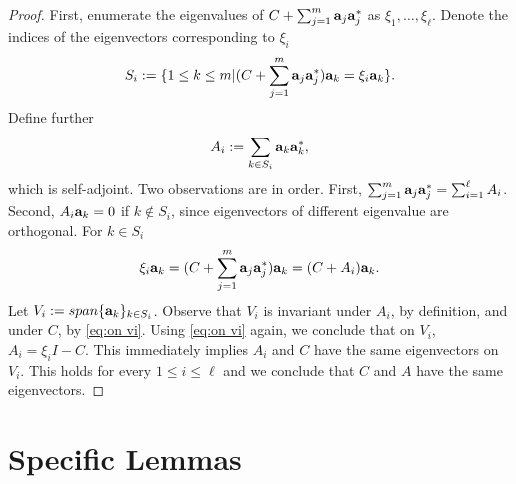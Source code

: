 \documentclass{amsart}
\numberwithin{equation}{section}
\begin{document}
\simdiag
\begin{proof}
  First, enumerate the eigenvalues of $C + \sum_{j=1}^m
  \mathbf{a}_j\mathbf{a}_j^*$ as $\xi_1,\dots,\xi_\ell$. Denote the
  indices of the eigenvectors corresponding to $\xi_i$
  \begin{equation*}
    S_i := \{ 1 \leq k \leq m | (C + \sum_{j=1}^m \mathbf{a}_j\mathbf{a}_j^* )\mathbf{a}_k = \xi_i \mathbf{a}_k \}.
  \end{equation*}
  Define further
  \begin{equation*}
    A_i := \sum_{k \in S_i} \mathbf{a}_k \mathbf{a}_k^*,
  \end{equation*}
  which is self-adjoint. Two observations are in order. First,
  $\sum_{j=1}^m \mathbf{a}_j\mathbf{a}_j^* = \sum_{i=1}^\ell A_i$. Second, $A_i
  \mathbf{a}_k = 0$ if $k\not \in S_i$, since eigenvectors of different
  eigenvalue are orthogonal. For $k \in S_i$
  \begin{equation}\label{eq:on vi}
    \xi_i \mathbf{a}_k = (C + \sum_{j=1}^m \mathbf{a}_j \mathbf{a}_j^* ) \mathbf{a}_k = (C + A_i) \mathbf{a}_k.
  \end{equation}
  Let $V_i := span \{\mathbf{a}_k \}_{k\in S_i}$. Observe that $V_i$ is
  invariant under $A_i$, by definition, and under $C$, by \eqref{eq:on
    vi}. Using \eqref{eq:on vi} again, we conclude that on $V_i$, $A_i
  = \xi_iI - C$. This immediately implies $A_i$ and $C$ have the
  same eigenvectors on $V_i$. This holds for every $1 \leq i \leq
  \ell$ and we conclude that $C$ and $A$ have the same eigenvectors.
\end{proof}


\section{Specific Lemmas}
\end{document}
